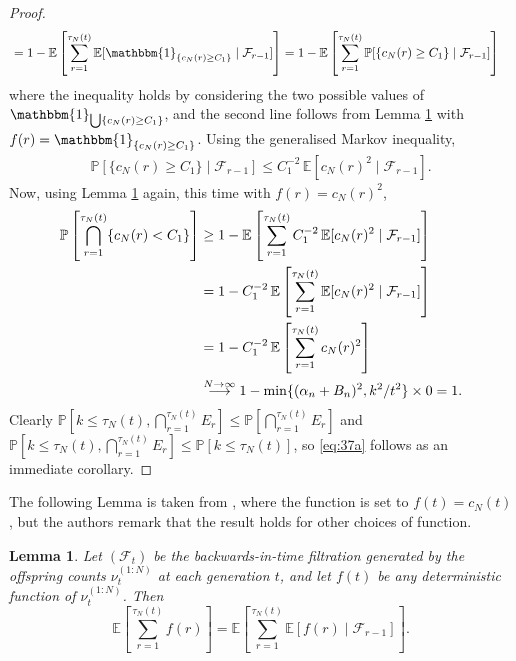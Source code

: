 \documentclass{article}
\newtheorem{lemma}{Lemma}
\newcommand{\Prob}{\mathbb{P}}
\newcommand{\E}{\mathbb{E}}
\newcommand{\1}[1]{\mathbbm{1}_{#1}}
\begin{document}
\begin{proof}
\begin{align}
&= 1 - \E \left[ \sum_{r=1}^{\tau_N(t)}  \E [ \1{\{c_N(r) \geq C_1\}} \mid \mathcal{F}_{r-1} ] \right]
= 1 - \E \left[ \sum_{r=1}^{\tau_N(t)} \Prob [\{c_N(r) \geq C_1\} \mid \mathcal{F}_{r-1} ] \right] 
\end{align}
where the inequality holds by considering the two possible values of $\1{\bigcup \{c_N(r) \geq C_1\}}$, and the second line follows from Lemma \ref{thm:kjjslemma2} with $f(r) = \1{\{c_N(r) \geq C_1\}}$.
Using the generalised Markov inequality,
\begin{align}
\Prob [\{c_N(r) \geq C_1\} \mid \mathcal{F}_{r-1} ] 
\leq C_1^{-2} \, \E[c_N(r)^2 \mid \mathcal{F}_{r-1} ] .
\end{align}
Now, using Lemma \ref{thm:kjjslemma2} again, this time with $f(r) = c_N(r)^2$,
\begin{align}
\Prob \left[  \bigcap_{r=1}^{\tau_N(t)} \{c_N(r) < C_1\} \right]
&\geq 1 - \E \left[  \sum_{r=1}^{\tau_N(t)} C_1^{-2} \, \E[c_N(r)^2 \mid \mathcal{F}_{r-1} ] \right] \notag\\
&= 1 - C_1^{-2} \,
\E \left[ \sum_{r=1}^{\tau_N(t)} \E[c_N(r)^2 \mid \mathcal{F}_{r-1} ] \right] \notag\\
&= 1 - C_1^{-2} \,
\E \left[ \sum_{r=1}^{\tau_N(t)} c_N(r)^2 \right] \notag\\
&\overset{N\to\infty}{\longrightarrow} 1 - \min\{(\alpha_n + B_n)^2 , k^2/t^2 \} \times 0 = 1 .
\end{align}
Clearly $\Prob \left[k \leq \tau_N(t), \bigcap_{r=1}^{\tau_N(t)} E_r \right] \leq \Prob \left[\bigcap_{r=1}^{\tau_N(t)} E_r \right]$ and $\Prob \left[k \leq \tau_N(t), \bigcap_{r=1}^{\tau_N(t)} E_r \right] \leq \Prob \left[ k \leq \tau_N(t) \right]$, so \eqref{eq:37a} follows as an immediate corollary.
\end{proof}


The following Lemma is taken from \citet[Lemma 2]{koskela2018}, where the function is set to $f(t) = c_N(t)$, but the authors remark that the result holds for other choices of function.
\begin{lemma}\label{thm:kjjslemma2}
Let $(\mathcal{F}_t)$ be the backwards-in-time filtration generated by the offspring counts $\nu_t^{(1:N)}$ at each generation $t$,
and let $f(t)$ be any deterministic function of $\nu_t^{(1:N)}$.
Then
\begin{equation}
\E \left[ \sum_{r=1}^{\tau_N(t)} f(r) \right] 
= \E \left[ \sum_{r=1}^{\tau_N(t)} \E [ f(r) \mid \mathcal{F}_{r-1} ] \right] .
\end{equation}
\end{lemma}


\end{document}
